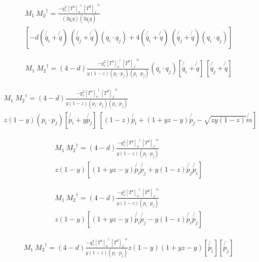 \begin{equation}
\begin{split}
M_1\: {M_2}^{\dagger} = \frac{-g_s^2 {[T^a]_o}^l \:{[T^d]_{f^{\prime}}}^n }{(2q_i q)(2q_j q)}\\ 
[-d(\not{q_i} + \not{q})\: (\not{q_j} + \not{q}) (q_i \cdot q_j)+4(\not{q_i} + \not{q})\:(\not{q_j} + \not{q}) (q_i \cdot q_j)]
\end{split}
\end{equation}

\begin{equation}
\begin{split}
M_1\: {M_2}^{\dagger} = (4-d)\frac{-g_s^2 {[T^a]_o}^l \:{[T^d]_{f^{\prime}}}^n }{y(1-z)(p_i \cdot p_j)(p_i \cdot p_j)}
(q_i \cdot q_j)[\not{q_i} + \not{q}]\:[\not{q_j} + \not{q}]
\end{split}
\end{equation}

\begin{equation}
\begin{split}
M_1\: {M_2}^{\dagger} = (4-d)\frac{-g_s^2 {[T^a]_o}^l \:{[T^d]_{f^{\prime}}}^n }{y(1-z)(p_i \cdot p_j)(p_i \cdot p_j)}\\
z(1-y)(p_i \cdot p_j)[\not{p_i} + y\not{p_j}]\:[(1-z)\not{p_i} + (1+yz-y) \not{p_j} - \sqrt{zy(1-z)}\not{m}]
\end{split}
\end{equation}

\begin{equation}
\begin{split}
M_1\: {M_2}^{\dagger} = (4-d)\frac{-g_s^2 {[T^a]_o}^l \:{[T^d]_{f^{\prime}}}^n }{y(1-z)(p_i \cdot p_j)}\\
z(1-y)[(1+yz-y)\not{p_i}\not{p_j} + y(1-z)\not{p_j}\not{p_i}]
\end{split}
\end{equation}

\begin{equation}
\begin{split}
M_1\: {M_2}^{\dagger} = (4-d)\frac{-g_s^2 {[T^a]_o}^l \:{[T^d]_{f^{\prime}}}^n }{y(1-z)(p_i \cdot p_j)}\\
z(1-y)[(1+yz-y)\not{p_i}\not{p_j} - y(1-z)\not{p_i}\not{p_j}]
\end{split}
\end{equation}

\begin{equation}
\begin{split}
M_1\: {M_2}^{\dagger} = (4-d)\frac{-g_s^2 {[T^a]_o}^l \:{[T^d]_{f^{\prime}}}^n }{y(1-z)(p_i \cdot p_j)}
z(1-y)(1+yz-y)[\not{p_i}][\not{p_j}]
\end{split}
\end{equation}


